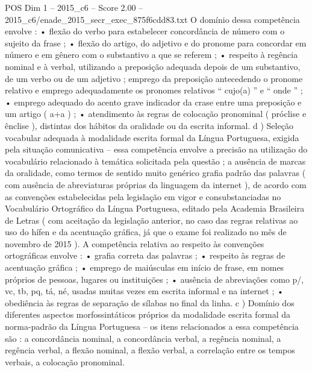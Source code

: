 \begin{textsample}{POS Dim 1 – 2015\_c6 – Score 2.00 – 2015\_c6/enade\_2015\_secr\_exec\_875f6cdd83.txt}
O domínio dessa competência envolve : • flexão do verbo para estabelecer concordância de número com o sujeito da frase ; • flexão do artigo, do adjetivo e do pronome para concordar em número e em gênero com o substantivo a que se referem ; • respeito à regência nominal e à verbal, utilizando a preposição adequada depois de um substantivo, de um verbo ou de um adjetivo ; emprego da preposição antecedendo o pronome relativo e emprego adequadamente os pronomes relativos “ cujo(a) ” e “ onde ” ; • emprego adequado do acento grave indicador da crase entre uma preposição e um artigo ( a+a ) ; • atendimento às regras de colocação pronominal ( próclise e ênclise ), distintas dos hábitos da oralidade ou da escrita informal. d ) Seleção vocabular adequada à modalidade escrita formal da Língua Portuguesa, exigida pela situação comunicativa – essa competência envolve a precisão na utilização do vocabulário relacionado à temática solicitada pela questão ; a ausência de marcas da oralidade, como termos de sentido muito genérico grafia padrão das palavras ( com ausência de abreviaturas próprias da linguagem da internet ), de acordo com as convenções estabelecidas pela legislação em vigor e consubstanciadas no Vocabulário Ortográfico da Língua Portuguesa, editado pela Academia Brasileira de Letras ( com aceitação da legislação anterior, no caso das regras relativas ao uso do hífen e da acentuação gráfica, já que o exame foi realizado no mês de novembro de 2015 ).
A competência relativa ao respeito às convenções ortográficas envolve : • grafia correta das palavras ; • respeito às regras de acentuação gráfica ; • emprego de maiúsculas em início de frase, em nomes próprios de pessoas, lugares ou instituições ; • ausência de abreviações como p/, vc, tb, pq, tá, né, usadas muitas vezes em escrita informal e na internet ; • obediência às regras de separação de sílabas no final da linha. c ) Domínio dos diferentes aspectos morfossintáticos próprios da modalidade escrita formal da norma-padrão da Língua Portuguesa – os itens relacionados a essa competência são : a concordância nominal, a concordância verbal, a regência nominal, a regência verbal, a flexão nominal, a flexão verbal, a correlação entre os tempos verbais, a colocação pronominal.

\end{textsample}
